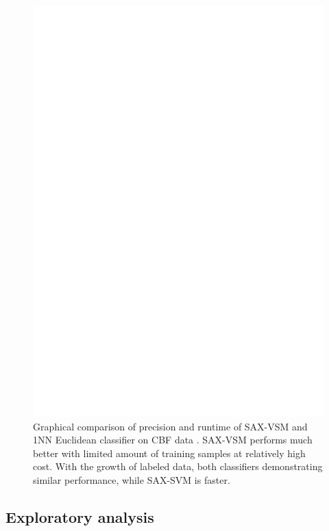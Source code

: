 \documentclass{llncs}
\begin{document}
\subsection{}
\begin{figure}[tbp]
   \centering
   \includegraphics[width=125mm]{figures/precision-runtime.ps}
   \caption{Graphical comparison of precision and runtime of SAX-VSM and 1NN Euclidean classifier on CBF data . 
   SAX-VSM performs much better with limited amount of training samples at relatively high cost. 
   With the growth of labeled data, both classifiers demonstrating similar performance, while SAX-SVM is faster.}
   \label{fig:precision-runtime}
\end{figure}

\subsection{Exploratory analysis}
\end{document}

